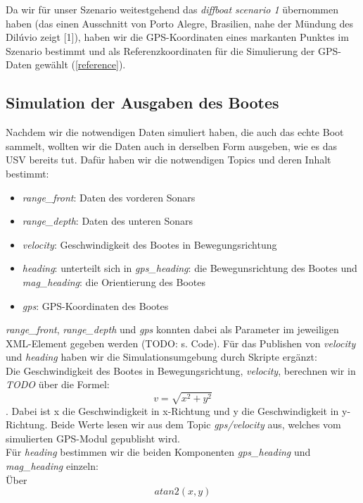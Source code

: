 \documentclass[conference]{IEEEtran}
\begin{document}
Da wir für unser Szenario weitestgehend das \textit{diffboat scenario 1} übernommen haben (das einen Ausschnitt von Porto Alegre, Brasilien, nahe der Mündung des Dilúvio zeigt [1]), haben wir die GPS-Koordinaten eines markanten Punktes im Szenario bestimmt und als Referenzkoordinaten für die Simulierung der GPS-Daten gewählt (\ref{reference}).

\subsection{Simulation der Ausgaben des Bootes}
Nachdem wir die notwendigen Daten simuliert haben, die auch das echte Boot sammelt, wollten wir die Daten auch in derselben Form ausgeben, wie es das USV bereits tut. Dafür haben wir die notwendigen Topics und deren Inhalt bestimmt:
\begin{itemize}
	\item \textit{range\_front}: Daten des vorderen Sonars
	\item \textit{range\_depth}: Daten des unteren Sonars
	\item \textit{velocity}: Geschwindigkeit des Bootes in Bewegungsrichtung
	\item \textit{heading}: unterteilt sich in \textit{gps\_heading}: die Bewegunsrichtung des Bootes und \textit{mag\_heading}: die Orientierung des Bootes
	\item \textit{gps}: GPS-Koordinaten des Bootes
\end{itemize}
\textit{range\_front}, \textit{range\_depth} und \textit{gps} konnten dabei als Parameter im jeweiligen XML-Element gegeben werden (TODO: s. Code). Für das Publishen von \textit{velocity} und \textit{heading} haben wir die Simulationsumgebung durch Skripte ergänzt:\\
Die Geschwindigkeit des Bootes in Bewegungsrichtung, \textit{velocity}, berechnen wir in \textit{TODO} über die Formel:
\begin{equation}
v = \sqrt{x^2+y^2}
\end{equation}
. Dabei ist x die Geschwindigkeit in x-Richtung und y die Geschwindigkeit in y-Richtung. Beide Werte lesen wir aus dem Topic \textit{gps/velocity} aus, welches vom simulierten GPS-Modul gepublisht wird.\\
Für \textit{heading} bestimmen wir die beiden Komponenten \textit{gps\_heading} und \textit{mag\_heading} einzeln:\\
Über 
\begin{equation}
	atan2(x,y) 	
\end{equation}
\end{document}
